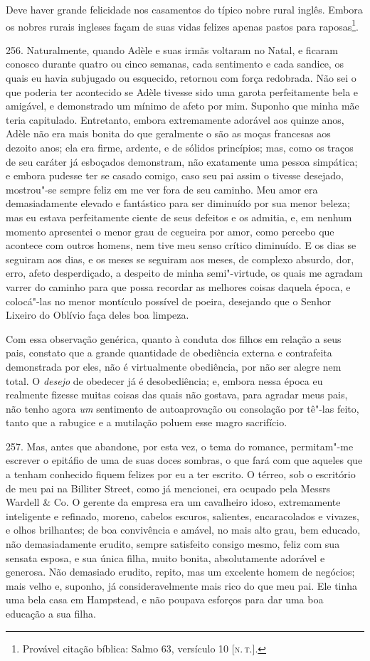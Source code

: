 Deve haver grande felicidade nos casamentos do típico nobre rural
inglês. Embora os nobres rurais ingleses façam de suas vidas felizes
apenas pastos para raposas\footnote{Provável citação bíblica: Salmo 63,
  versículo 10 {[}\textsc{n.\,t.}{]}.}.

256. Naturalmente, quando Adèle e suas irmãs voltaram no Natal, e
ficaram conosco durante quatro ou cinco semanas, cada sentimento e cada
sandice, os quais eu havia subjugado ou esquecido, retornou com força
redobrada. Não sei o que poderia ter acontecido se Adèle tivesse sido
uma garota perfeitamente bela e amigável, e demonstrado um mínimo de
afeto por mim. Suponho que minha mãe teria capitulado. Entretanto,
embora extremamente adorável aos quinze anos, Adèle não era mais bonita
do que geralmente o são as moças francesas aos dezoito anos; ela era
firme, ardente, e de sólidos princípios; mas, como os traços de seu
caráter já esboçados demonstram, não exatamente uma pessoa simpática; e
embora pudesse ter se casado comigo, caso seu pai assim o tivesse
desejado, mostrou"-se sempre feliz em me ver fora de seu caminho. Meu
amor era demasiadamente elevado e fantástico para ser diminuído por sua
menor beleza; mas eu estava perfeitamente ciente de seus defeitos e os
admitia, e, em nenhum momento apresentei o menor grau de cegueira por
amor, como percebo que acontece com outros homens, nem tive meu senso
crítico diminuído. E os dias se seguiram aos dias, e os meses se
seguiram aos meses, de complexo absurdo, dor, erro, afeto desperdiçado,
a despeito de minha semi"-virtude, os quais me agradam varrer do caminho
para que possa recordar as melhores coisas daquela época, e colocá"-las
no menor montículo possível de poeira, desejando que o Senhor Lixeiro do
Oblívio faça deles boa limpeza.

Com essa observação genérica, quanto à conduta dos filhos em relação a
seus pais, constato que a grande quantidade de obediência externa e
contrafeita demonstrada por eles, não é virtualmente obediência, por não
ser alegre nem total. O \emph{desejo} de obedecer já é desobediência; e,
embora nessa época eu realmente fizesse muitas coisas das quais não
gostava, para agradar meus pais, não tenho agora \emph{um} sentimento de
autoaprovação ou consolação por tê"-las feito, tanto que a rabugice e a
mutilação poluem esse magro sacrifício.

257. Mas, antes que abandone, por esta vez, o tema do romance,
permitam"-me escrever o epitáfio de uma de suas doces sombras, o que fará
com que aqueles que a tenham conhecido fiquem felizes por eu a ter
escrito. O térreo, sob o escritório de meu pai na Billiter Street, como
já mencionei, era ocupado pela Messrs Wardell \& Co. O gerente da
empresa era um cavalheiro idoso, extremamente inteligente e refinado,
moreno, cabelos escuros, salientes, encaracolados e vivazes, e olhos
brilhantes; de boa convivência e amável, no mais alto grau, bem educado,
não demasiadamente erudito, sempre satisfeito consigo mesmo, feliz com
sua sensata esposa, e sua única filha, muito bonita, absolutamente
adorável e generosa. Não demasiado erudito, repito, mas um excelente
homem de negócios; mais velho e, suponho, já consideravelmente mais rico
do que meu pai. Ele tinha uma bela casa em Hampstead, e não poupava
esforços para dar uma boa educação a sua filha.


